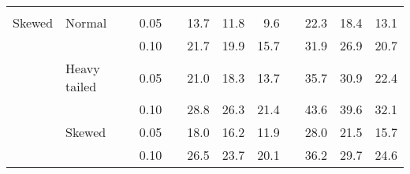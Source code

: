 \begin{table}[ht]
\begin{scriptsize}
\begin{center}
\begin{tabular}{ll p{.1cm} c p{.1cm} rrr p{.1cm} rrr}
&&&&&&&&&&&\\
Skewed       & Normal       && 0.05 &&   13.7 & 11.8 & 9.6 &   & 22.3 & 18.4 & 13.1 \\ 
             &              && 0.10 &&   21.7 & 19.9 & 15.7 &   & 31.9 & 26.9 & 20.7 \\ 
             & Heavy tailed && 0.05 &&   21.0 & 18.3 & 13.7 &   & 35.7 & 30.9 & 22.4 \\ 
             &              && 0.10 &&   28.8 & 26.3 & 21.4 &   & 43.6 & 39.6 & 32.1 \\ 
             & Skewed       && 0.05 &&   18.0 & 16.2 & 11.9 &   & 28.0 & 21.5 & 15.7 \\ 
             &              && 0.10 &&   26.5 & 23.7 & 20.1 &   & 36.2 & 29.7 & 24.6 \\ 


\end{tabular}
\end{center}
\end{scriptsize}
\end{table}
